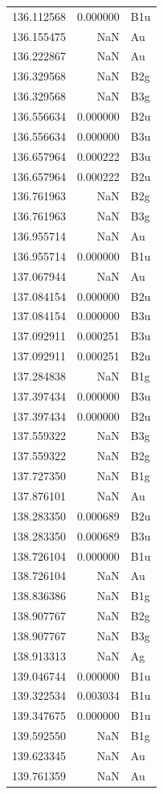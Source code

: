\begin{longtable}{rrl}
136.112568 & 0.000000 & B1u \\
136.155475 & NaN & Au \\
136.222867 & NaN & Au \\
136.329568 & NaN & B2g \\
136.329568 & NaN & B3g \\
136.556634 & 0.000000 & B2u \\
136.556634 & 0.000000 & B3u \\
136.657964 & 0.000222 & B3u \\
136.657964 & 0.000222 & B2u \\
136.761963 & NaN & B2g \\
136.761963 & NaN & B3g \\
136.955714 & NaN & Au \\
136.955714 & 0.000000 & B1u \\
137.067944 & NaN & Au \\
137.084154 & 0.000000 & B2u \\
137.084154 & 0.000000 & B3u \\
137.092911 & 0.000251 & B3u \\
137.092911 & 0.000251 & B2u \\
137.284838 & NaN & B1g \\
137.397434 & 0.000000 & B3u \\
137.397434 & 0.000000 & B2u \\
137.559322 & NaN & B3g \\
137.559322 & NaN & B2g \\
137.727350 & NaN & B1g \\
137.876101 & NaN & Au \\
138.283350 & 0.000689 & B2u \\
138.283350 & 0.000689 & B3u \\
138.726104 & 0.000000 & B1u \\
138.726104 & NaN & Au \\
138.836386 & NaN & B1g \\
138.907767 & NaN & B2g \\
138.907767 & NaN & B3g \\
138.913313 & NaN & Ag \\
139.046744 & 0.000000 & B1u \\
139.322534 & 0.003034 & B1u \\
139.347675 & 0.000000 & B1u \\
139.592550 & NaN & B1g \\
139.623345 & NaN & Au \\
139.761359 & NaN & Au \\

\end{longtable}
